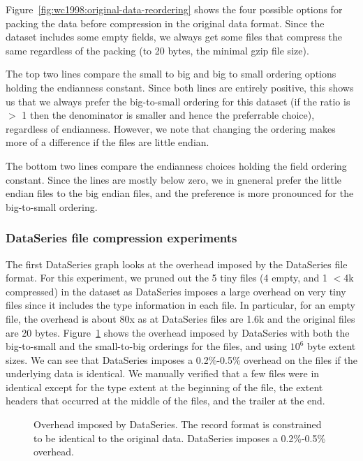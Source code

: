 Figure~\ref{fig:wc1998:original-data-reordering} shows the four
possible options for packing the data before compression in the
original data format.  Since the dataset includes some empty fields,
we always get some files that compress the same regardless of the
packing (to 20 bytes, the minimal gzip file size). 

The top two lines compare the small to big and big to small ordering
options holding the endianness constant.  Since both lines are
entirely positive, this shows us that we always prefer the
big-to-small ordering for this dataset (if the ratio is $>$ 1 then the
denominator is smaller and hence the preferrable choice), regardless
of endianness.  However, we note that changing the ordering makes more
of a difference if the files are little endian.

The bottom two lines compare the endianness choices holding the field
ordering constant.  Since the lines are mostly below zero, we in
gneneral prefer the little endian files to the big endian files, and
the preference is more pronounced for the big-to-small ordering.

\subsubsection{DataSeries file compression experiments}

The first DataSeries graph looks at the overhead imposed by the
DataSeries file format.  For this experiment, we pruned out the 5 tiny
files (4 empty, and 1 $<$4k compressed) in the dataset as DataSeries
imposes a large overhead on very tiny files since it includes the type
information in each file.  In particular, for an empty file, the
overhead is about 80x as at DataSeries files are 1.6k and the original
files are 20 bytes.  Figure~\ref{fig:wc1998:ds-overhead} shows
the overhead imposed by DataSeries with both the big-to-small and the
small-to-big orderings for the files, and using $10^6$ byte extent
sizes.  We can see that DataSeries imposes a 0.2\%-0.5\% overhead on
the files if the underlying data is identical.  We manually verified
that a few files were in identical except for the type extent at the
beginning of the file, the extent headers that occurred at the middle
of the files, and the trailer at the end.

\begin{figure}
\caption{Overhead imposed by DataSeries. The record format is constrained
to be identical to the original data.  DataSeries imposes a
0.2\%-0.5\% overhead.}
\label{fig:wc1998:ds-overhead}
\end{figure}

